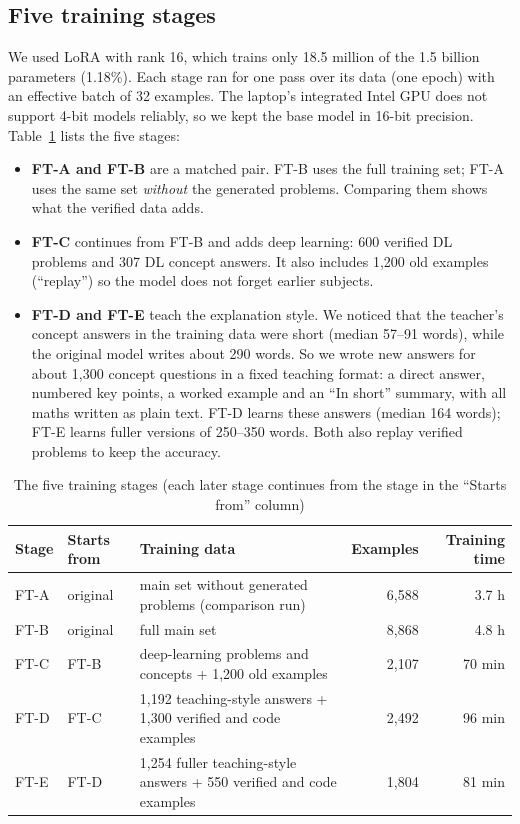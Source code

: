 \documentclass[conference]{IEEEtran}
\begin{document}
\subsection{Five training stages}
We used LoRA with rank 16, which trains only 18.5 million of the 1.5 billion parameters (1.18\%). Each stage ran for one pass over its data (one epoch) with an effective batch of 32 examples. The laptop's integrated Intel GPU does not support 4-bit models reliably, so we kept the base model in 16-bit precision. Table~\ref{tab:runs} lists the five stages:
\begin{itemize}
\item \textbf{FT-A and FT-B} are a matched pair. FT-B uses the full training set; FT-A uses the same set \emph{without} the generated problems. Comparing them shows what the verified data adds.
\item \textbf{FT-C} continues from FT-B and adds deep learning: 600 verified DL problems and 307 DL concept answers. It also includes 1,200 old examples (``replay'') so the model does not forget earlier subjects.
\item \textbf{FT-D and FT-E} teach the explanation style. We noticed that the teacher's concept answers in the training data were short (median 57--91 words), while the original model writes about 290 words. So we wrote new answers for about 1,300 concept questions in a fixed teaching format: a direct answer, numbered key points, a worked example and an ``In short'' summary, with all maths written as plain text. FT-D learns these answers (median 164 words); FT-E learns fuller versions of 250--350 words. Both also replay verified problems to keep the accuracy.
\end{itemize}

\begin{table}[t]
\centering
\caption{The five training stages (each later stage continues from the stage in the ``Starts from'' column)}
\label{tab:runs}
\begin{tabular}{@{}l l l r r@{}}
\toprule
Stage & Starts from & Training data & Examples & Training time \\
\midrule
FT-A & original & main set without generated problems (comparison run) & 6,588 & 3.7 h \\
FT-B & original & full main set & 8,868 & 4.8 h \\
FT-C & FT-B & deep-learning problems and concepts + 1,200 old examples & 2,107 & 70 min \\
FT-D & FT-C & 1,192 teaching-style answers + 1,300 verified and code examples & 2,492 & 96 min \\
FT-E & FT-D & 1,254 fuller teaching-style answers + 550 verified and code examples & 1,804 & 81 min \\
\bottomrule
\end{tabular}
\end{table}
\end{document}
